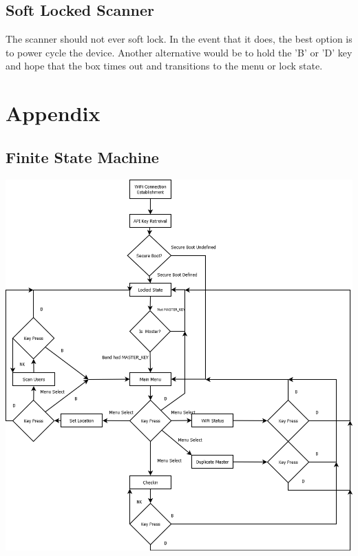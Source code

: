 \documentclass{article}
\begin{document}
\subsection{Soft Locked Scanner}
The scanner should not ever soft lock.  In the event that it does, the best option is to power cycle the device.  Another alternative would be to hold the 'B' or 'D' key and hope that the box times out and transitions to the menu or lock state.

\newpage\section{Appendix}

\subsection{Finite State Machine}
\begin{center}\includegraphics[scale=0.25]{states}\end{center}
\end{document}
